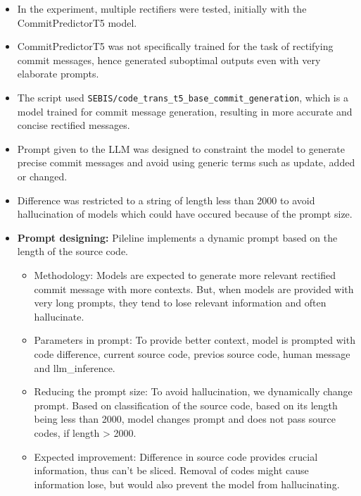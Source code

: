 \documentclass[12pt, a4paper]{report}
\begin{document}
\begin{itemize}
    \item In the experiment, multiple rectifiers were tested, initially with the CommitPredictorT5 model.
    \item CommitPredictorT5 was not specifically trained for the task of rectifying commit messages, hence generated suboptimal outputs even with very elaborate prompts.
    \item The script used \texttt{SEBIS/code\_trans\_t5\_base\_commit\_generation}, which is a model trained for commit message generation, resulting in more accurate and concise rectified messages.
    \item Prompt given to the LLM was designed to constraint the model to generate precise commit messages and avoid using generic terms such as update, added or changed.
    \item Difference was restricted to a string of length less than 2000 to avoid hallucination of models which could have occured because of the prompt size.
    \item \textbf{Prompt designing: } Pileline implements a dynamic prompt based on the length of the source code.
    \begin{itemize}
        \item {Methodology: } Models are expected to generate more relevant rectified commit message with more contexts. But, when models are provided with very long prompts, they tend to lose relevant information and often hallucinate.
        \item {Parameters in prompt: } To provide better context, model is prompted with code difference, current source code, previos source code, human message and llm\_inference.
        \item {Reducing the prompt size: } To avoid hallucination, we dynamically change prompt. Based on classification of the source code, based on its length being less than 2000, model changes prompt and does not pass source codes, if length > 2000.
        \item {Expected improvement: } Difference in source code provides crucial information, thus can't be sliced. Removal of codes might cause information lose, but would also prevent the model from hallucinating.
    \end{itemize}
\end{itemize}

\end{document}
